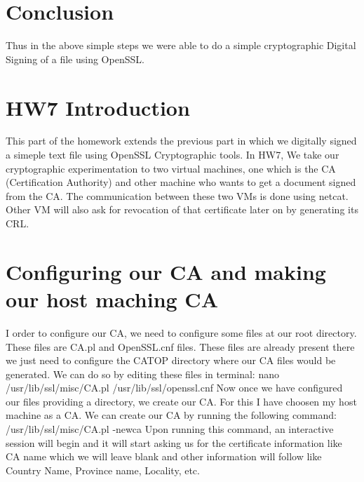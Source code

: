 \documentclass[11pt]{article}
\begin{document}
\section{Conclusion}
Thus in the above simple steps we were able to do a simple cryptographic Digital Signing of a file using OpenSSL.

\newpage

\section{HW7 Introduction}
This part of the homework extends the previous part in which we digitally signed a simeple text file using OpenSSL Cryptographic tools. In HW7, We take our cryptographic experimentation to two virtual machines, one which is the CA (Certification Authority) and other machine who wants to get a document signed from the CA. The communication between these two VMs is done using netcat. Other VM will also ask for revocation of that certificate later on by generating its CRL.

\section{Configuring our CA and making our host maching CA}
I order to configure our CA, we need to configure some files at our root directory. These files are CA.pl and OpenSSL.cnf files. These files are already present there we just need to configure the CATOP directory where our CA files would be generated. We can do so by editing these files in terminal: \newline \newline nano /usr/lib/ssl/misc/CA.pl \newline \newline /usr/lib/ssl/openssl.cnf  \newline \newline Now once we have configured our files providing a directory, we create our CA. For this I have choosen my host machine as a CA. We can create our CA by running the following command: \newline \newline /usr/lib/ssl/misc/CA.pl -newca \newline \newline Upon running this command, an interactive session will begin and it will start asking us for the certificate information like CA name which we will leave blank and other information will follow like Country Name, Province name, Locality, etc.
\end{document}
